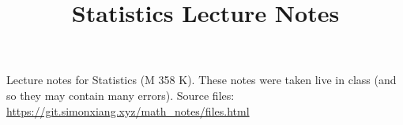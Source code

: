 \documentclass[fontsize=9pt]{article}
\title{Statistics Lecture Notes}
\date{}
\begin{document}
\maketitle
Lecture notes for Statistics (M 358 K). These notes were taken live in class (and so they may contain many errors). Source files: \url{https://git.simonxiang.xyz/math_notes/files.html}

\tableofcontents
\newpage
    
\end{document}
